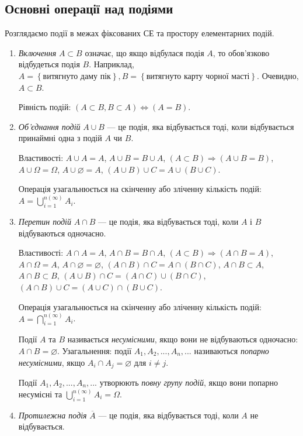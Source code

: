 \subsection*{Основні операції над подіями}
\begin{remark}
    Розглядаємо події в межах фіксованих СЕ та простору елементарних подій.
\end{remark}
\begin{enumerate}
    \item \emph{Включення} $A \subset B$ означає, що якщо відбулася подія $A$, то обов'язково відбудеться подія $B$.
    Наприклад, $A = \left\{\text{витягнуто даму пік}\right\}, B = \left\{\text{витягнуто карту чорної масті}\right\}$. 
    Очевидно, $A\subset B$.

    Рівність подій: $\left( A \subset B, B \subset A \right) \iff \left( A = B\right)$.
    \item \emph{Об'єднання подій} $A \cup B$ --- це подія, яка відбувається тоді, коли відбувається
    принаймні одна з подій $A$ чи $B$.

    Властивості: $A \cup A = A$,  $A \cup B = B \cup A$, $\left( A \subset B \right) \Rightarrow \left( A \cup B = B \right)$, 
    $A \cup \Omega = \Omega$, $A \cup \varnothing = A$, $\left( A \cup B \right) \cup C = A \cup \left( B \cup C \right)$.

    Операція узагальнюється на скінченну або зліченну кількість подій: $A = \bigcup_{i=1}^{n \left( \infty \right)} A_i$.
    \item \emph{Перетин подій} $A \cap B$ --- це подія, яка відбувається тоді, коли $A$ і $B$ відбуваються одночасно.

    Властивості: $A \cap A = A$,  $A \cap B = B \cap A$, $\left( A \subset B \right) \Rightarrow \left( A \cap B = A \right)$, 
    $A \cap \Omega = A$, $A \cap \varnothing = \varnothing$, $\left( A \cap B \right) \cap C = A \cap \left( B \cap C \right)$,
    $A \cap B \subset A$, $A \cap B \subset B$, $\left( A \cup B \right) \cap C = \left( A \cap C \right) \cup \left( B \cap C \right)$,
    $\left( A \cap B \right) \cup C = \left( A \cup C \right) \cap \left( B \cup C \right)$.

    Операція узагальнюється на скінченну або зліченну кількість подій: $A = \bigcap_{i=1}^{n \left( \infty \right)} A_i$.
    \begin{definition}
        Події $A$ та $B$ називається \emph{несумісними}, якщо вони не відбуваються одночасно: $A \cap B = \varnothing$.
        Узагальнення: події $A_1, A_2, ..., A_n, ...$ називаються \emph{попарно несумісними}, якщо $A_i \cap A_j = \varnothing$ для $i \neq j$.
    \end{definition}
    \begin{definition}
        Події $A_1, A_2, ..., A_n, ...$ утворюють \emph{повну групу подій}, якщо вони попарно несумісні 
        та $\bigcup_{i=1}^{n \left( \infty \right)} A_i = \Omega$.
    \end{definition}
    \item \emph{Протилежна подія} $\overline{A}$ --- це подія, яка відбувається тоді, коли $A$ не відбувається.
    

\end{enumerate}
